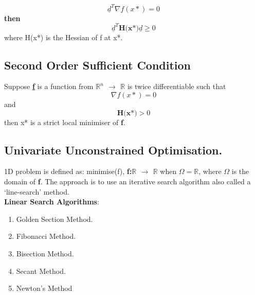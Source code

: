 \documentclass[12pt,a4paper,titlepage]{article}
\begin{document}
\begin{equation}
    \underline{d}^T \nabla f(x*)= 0 \label{eq3}
\end{equation}
\textbf{then}
\begin{equation}
    \underline{d}^T \textbf{H(x*)} \underline{d} \geq 0 \label{eq4}
\end{equation}
where H(x*) is the Hessian of f at x*.

\subsection{Second Order Sufficient Condition}
Suppose \textbf{\underline{f}} is a function from \textbf{$\mathbb{R}^n$ $\rightarrow$ $\mathbb{R}$} is twice differentiable such that 
\begin{equation}
    \nabla f(x*)=0    
\end{equation}
and
\begin{equation}
    \textbf{H(x*)} > 0
\end{equation}
then x* is a strict local minimiser of \textbf{f}.

\subsection{Univariate Unconstrained Optimisation.}
1D problem is defined as:
minimise(f), \textbf{f:$\mathbb{R}$ $\rightarrow$ $\mathbb{R}$} when $\Omega = \mathbb{R}$, where $\Omega$ is the domain of \textbf{f}.
The approach is to use an iterative search algorithm also called a `line-search' method. \\
\textbf{Linear Search Algorithms}: 
\begin{enumerate}
    \item Golden Section Method.
    \item Fibonacci Method.
    \item Bisection Method.
    \item Secant Method.
    \item Newton's Method
\end{enumerate}
\end{document}
